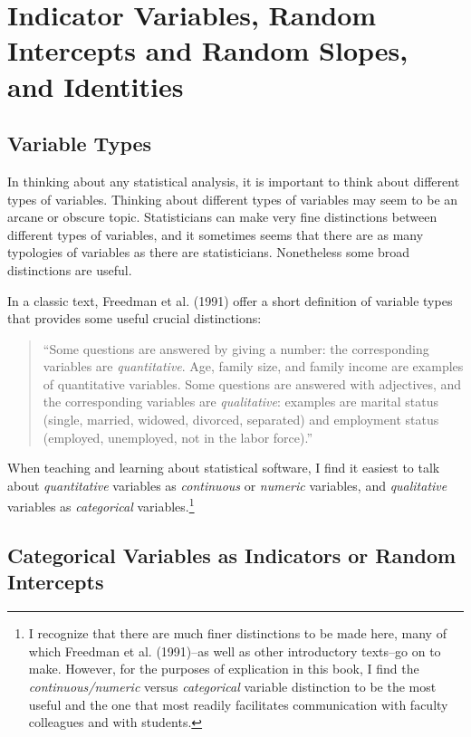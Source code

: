 \documentclass[
  letterpaper,
  DIV=11,
  numbers=noendperiod]{scrreprt}
\begin{document}
\section{Indicator Variables, Random Intercepts and Random Slopes, and
Identities}\label{indicator-variables-random-intercepts-and-random-slopes-and-identities}

\subsection{Variable Types}\label{variable-types}

In thinking about any statistical analysis, it is important to think
about different types of variables. Thinking about different types of
variables may seem to be an arcane or obscure topic. Statisticians can
make very fine distinctions between different types of variables, and it
sometimes seems that there are as many typologies of variables as there
are statisticians. Nonetheless some broad distinctions are useful.

In a classic text, Freedman et al. (1991) offer a short definition of
variable types that provides some useful crucial distinctions:

\begin{quote}
``Some questions are answered by giving a number: the corresponding
variables are \emph{quantitative}. Age, family size, and family income
are examples of quantitative variables. Some questions are answered with
adjectives, and the corresponding variables are \emph{qualitative}:
examples are marital status (single, married, widowed, divorced,
separated) and employment status (employed, unemployed, not in the labor
force).''
\end{quote}

When teaching and learning about statistical software, I find it easiest
to talk about \emph{quantitative} variables as \emph{continuous} or
\emph{numeric} variables, and \emph{qualitative} variables as
\emph{categorical} variables.\footnote{I recognize that there are much
  finer distinctions to be made here, many of which Freedman et al.
  (1991)--as well as other introductory texts--go on to make. However,
  for the purposes of explication in this book, I find the
  \emph{continuous/numeric} versus \emph{categorical} variable
  distinction to be the most useful and the one that most readily
  facilitates communication with faculty colleagues and with students.}

\subsection{Categorical Variables as Indicators or Random
Intercepts}\label{categorical-variables-as-indicators-or-random-intercepts}
\end{document}
